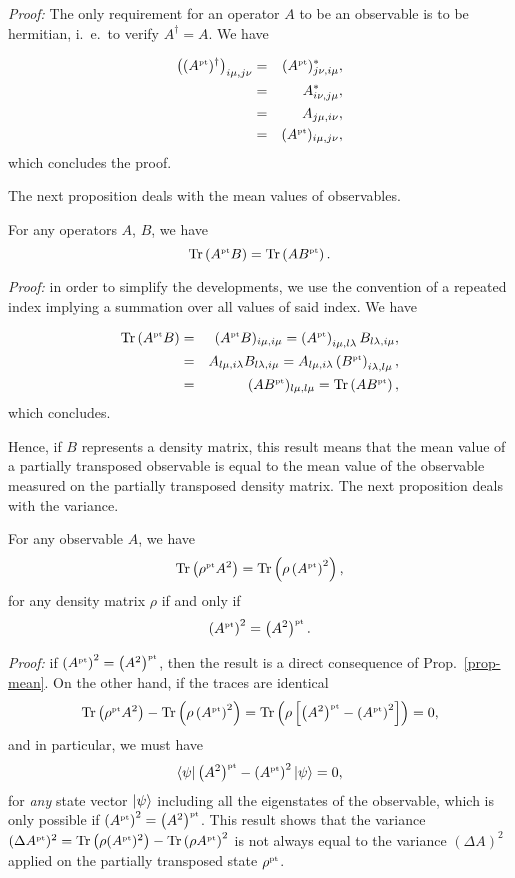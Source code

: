 \emph{Proof: } The only requirement for an operator $A$ to be an observable is to be hermitian, i.~e.~to verify $A^\dagger=A$. We have

\begin{eqnarray}
  \left((A^{\mbox{\tiny \textup{pt}}})^\dagger \right)_{i\mu,j\nu}  &=& (A^{\mbox{\tiny \textup{pt}}})_{j\nu,i\mu}^* ,\\
  &=& A_{i\nu,j\mu}^* ,\\
  &=& A_{j\mu,i\nu} ,\\
  &=& (A^{\mbox{\tiny \textup{pt}}})_{i\mu,j\nu},
\end{eqnarray}
which concludes the proof.

The next proposition deals with the mean values of observables.

\begin{prop} \label{prop-mean}
  For any operators $A$, $B$, we have
  \[ \mbox{\textup{Tr}}\left( A^{\mbox{\tiny \textup{pt}}} B \right) = \mbox{\textup{Tr}}\left(  A B^{\mbox{\tiny \textup{pt}}} \right).\]
\end{prop}

\emph{Proof: } in order to simplify the developments, we use the convention of a repeated index implying a summation over all values of said index. We have

\begin{eqnarray}
  \mbox{\textup{Tr}}\left( A^{\mbox{\tiny \textup{pt}}} B \right) &=& (A^{\mbox{\tiny \textup{pt}}} B)_{i\mu,i\mu} = \left( A^{\mbox{\tiny \textup{pt}}}\right)_{i\mu,l\lambda} B_{l\lambda,i\mu} ,\\
  &=&  A_{l\mu,i\lambda} B_{l\lambda,i\mu} =  A_{l\mu,i\lambda} \left(B^{\mbox{\tiny \textup{pt}}} \right)_{i\lambda,l\mu}, \\
  &=&   (A B^{\mbox{\tiny \textup{pt}}} )_{l\mu,l\mu} =  \mbox{\textup{Tr}}\left( A B^{\mbox{\tiny \textup{pt}}} \right) ,
\end{eqnarray}
which concludes.

Hence, if $B$ represents a density matrix, this result means that the mean value of a partially transposed observable is equal to the mean value of the observable measured on the partially transposed density matrix. The next proposition deals with the variance.

\begin{prop} \label{prop-rem}
  For any observable $A$, we have
  \[\mbox{\textup{Tr}}\left( \rho^{\mbox{\tiny \textup{pt}}} A^2 \right) = \mbox{\textup{Tr}}\left(  \rho \left(A^{\mbox{\tiny \textup{pt}}} \right)^2  \right), \]
  for any density matrix $\rho$ if and only if
  \[\left(A^{\mbox{\tiny \textup{pt}}}\right)^2 = \left(A^2\right)^{\mbox{\tiny \textup{pt}}} .\label{eq-rem}\]
\end{prop}

\emph{Proof: } if $ \left(A^{\mbox{\tiny \textup{pt}}}\right)^2 =\left(A^2\right)^{\mbox{\tiny \textup{pt}}}$, then the result is a direct consequence of Prop.~\ref{prop-mean}. On the other hand, if the traces are identical
\[ \mbox{\textup{Tr}}\left( \rho^{\mbox{\tiny \textup{pt}}} A^2 \right) - \mbox{\textup{Tr}}\left(  \rho \left(A^{\mbox{\tiny \textup{pt}}} \right)^2  \right) = \mbox{\textup{Tr}}\left(  \rho \left[ \left(A^2\right)^{\mbox{\tiny \textup{pt}}} - \left(A^{\mbox{\tiny \textup{pt}}} \right)^2 \right]  \right) = 0 ,\]
and in particular, we must have
\[ \langle \psi | \left(A^2\right)^{\mbox{\tiny \textup{pt}}} - \left(A^{\mbox{\tiny \textup{pt}}} \right)^2 | \psi \rangle =0,\]
for \emph{any} state vector $| \psi \rangle$ including all the eigenstates of the observable, which is only possible if $\left(A^{\mbox{\tiny \textup{pt}}}\right)^2 = \left(A^2\right)^{\mbox{\tiny \textup{pt}}}$. This result shows that the variance $(\Delta A^{\mbox{\tiny \textup{pt}}})^2=\mbox{\textup{Tr}}\left( \rho (A^{\mbox{\tiny \textup{pt}}})^2 \right)-\mbox{\textup{Tr}}\left( \rho A^{\mbox{\tiny \textup{pt}}} \right)^2$ is not always equal to the variance $(\Delta A)^2$ applied on the partially transposed state $\rho^{\mbox{\tiny \textup{pt}}}$.

